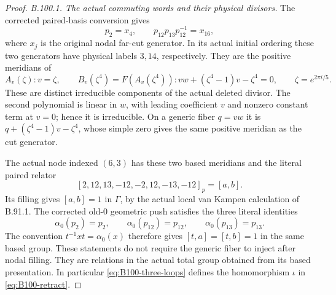 \begin{proof}
\emph{B.100.1. The actual commuting words and their physical divisors.}
The corrected paired-basis conversion gives
\[
 p_2=x_4,\qquad p_{12}p_{13}p_{12}^{-1}=x_{16},
\]
where $x_j$ is the original nodal far-cut generator.  In its actual
initial ordering these two generators have physical labels $3,14$,
respectively.  They are the positive meridians of
\[
 A_v(\zeta):v=\zeta,
 \qquad B_v(\zeta^4)=F(A_v(\zeta^4)):
              vw+(\zeta^4-1)v-\zeta^4=0,
 \qquad \zeta=e^{2\pi i/5}.
\]
These are distinct irreducible components of the actual deleted
divisor.  The second polynomial is linear in $w$, with leading
coefficient $v$ and nonzero constant term at $v=0$; hence it is
irreducible.  On a generic fiber $q=vw$ it is
$q+(\zeta^4-1)v-\zeta^4$, whose simple zero gives the same positive
meridian as the cut generator.

The actual node indexed $(6,3)$ has these two based meridians
and the literal paired relator
\begin{equation}\label{eq:B100-node}
 [2,12,13,-12,-2,12,-13,-12]_p=[a,b].
\end{equation}
Its filling gives $[a,b]=1$ in $\Gamma$, by the actual local
van Kampen calculation of B.91.1.  The corrected old-$0$ geometric
push satisfies the three literal identities
\[
 \alpha_0(p_2)=p_2,\qquad
 \alpha_0(p_{12})=p_{12},\qquad
 \alpha_0(p_{13})=p_{13}.
\]
The convention $t^{-1}x t=\alpha_0(x)$ therefore gives
$[t,a]=[t,b]=1$ in the same based group.  These statements do
not require the generic fiber to inject after nodal filling.
They are relations in the actual total group obtained from its
based presentation.  In particular \eqref{eq:B100-three-loops}
defines the homomorphism $\iota$ in \eqref{eq:B100-retract}.


\end{proof}
